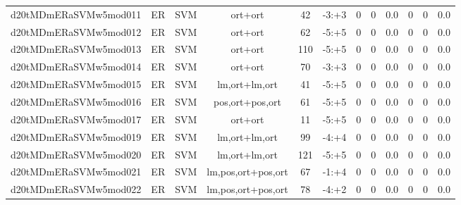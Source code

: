 \documentclass[a4paper]{article}
\begin{document}
\begin{landscape}
\begin{center}
\begin{tabular}{ |c|c|c|c|c|c|c|c|c|c|c|c|}
 
 	
 	\small{ d20tMDmERaSVMw5mod011 } & ER & SVM & ort+ort  &  42 &  -3:+3  &  0 & 0 & 0.0  &  0 & 0 & 0.0 \\
 	

 
 	
 	\small{ d20tMDmERaSVMw5mod012 } & ER & SVM & ort+ort  &  62 &  -5:+5  &  0 & 0 & 0.0  &  0 & 0 & 0.0 \\
 	

 
 	
 	\small{ d20tMDmERaSVMw5mod013 } & ER & SVM & ort+ort  &  110 &  -5:+5  &  0 & 0 & 0.0  &  0 & 0 & 0.0 \\
 	

 
 	
 	\small{ d20tMDmERaSVMw5mod014 } & ER & SVM & ort+ort  &  70 &  -3:+3  &  0 & 0 & 0.0  &  0 & 0 & 0.0 \\
 	

 
 	
 	\small{ d20tMDmERaSVMw5mod015 } & ER & SVM & lm,ort+lm,ort  &  41 &  -5:+5  &  0 & 0 & 0.0  &  0 & 0 & 0.0 \\
 	

 
 	
 	\small{ d20tMDmERaSVMw5mod016 } & ER & SVM & pos,ort+pos,ort  &  61 &  -5:+5  &  0 & 0 & 0.0  &  0 & 0 & 0.0 \\
 	

 
 	
 	\small{ d20tMDmERaSVMw5mod017 } & ER & SVM & ort+ort  &  11 &  -5:+5  &  0 & 0 & 0.0  &  0 & 0 & 0.0 \\
 	

 
 	
 	\small{ d20tMDmERaSVMw5mod019 } & ER & SVM & lm,ort+lm,ort  &  99 &  -4:+4  &  0 & 0 & 0.0  &  0 & 0 & 0.0 \\
 	

 
 	
 	\small{ d20tMDmERaSVMw5mod020 } & ER & SVM & lm,ort+lm,ort  &  121 &  -5:+5  &  0 & 0 & 0.0  &  0 & 0 & 0.0 \\
 	

 
 	
 	\small{ d20tMDmERaSVMw5mod021 } & ER & SVM & lm,pos,ort+pos,ort  &  67 &  -1:+4  &  0 & 0 & 0.0  &  0 & 0 & 0.0 \\
 	

 
 	
 	\small{ d20tMDmERaSVMw5mod022 } & ER & SVM & lm,pos,ort+pos,ort  &  78 &  -4:+2  &  0 & 0 & 0.0  &  0 & 0 & 0.0 \\
 	


\end{tabular}
\end{center}
\end{landscape}
\end{document}
